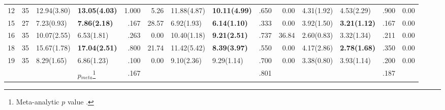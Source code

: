 \begin{sidewaystable}[!htbp]
{\begin{tabular}{ccllrr@{\hspace{2em}}llrr@{\hspace{2em}}llrr}
  12 & 35 & 12.94(3.80) & \textbf{13.05(4.03)} & 1.000 & 5.26 & 11.88(4.87) & \textbf{10.11(4.99)} & .650 & 0.00 & 4.31(1.92) & 4.53(2.29) & .900 & 0.00 \\ 
  15 & 27 & 7.23(0.93) & \textbf{7.86(2.18)} & .167 & 28.57 & 6.92(1.93) & \textbf{6.14(1.10)} & .333 & 0.00 & 3.92(1.50) & \textbf{3.21(1.12)} & .167 & 0.00 \\ 
  16 & 35 & 10.07(2.55) & 6.53(1.81) & .263 & 0.00 & 10.40(1.18) & \textbf{9.21(2.51)} & .737 & 36.84 & 2.60(0.83) & 3.32(1.34) & .211 & 0.00 \\ 
  18 & 35 & 15.67(1.78) & \textbf{17.04(2.51)} & .800 & 21.74 & 11.42(5.42) & \textbf{8.39(3.97)} & .550 & 0.00 & 4.17(2.86) & \textbf{2.78(1.68)} & .350 & 0.00 \\ 
  19 & 35 & 8.29(1.65) & 6.86(1.23) & .100 & 0.00 & 9.10(2.36) & 9.29(1.14) & .700 & 0.00 & 3.38(0.80) & 3.93(1.14) & .200 & 0.00 \\ 
   \cline{5-5} \cline{9-9} \cline{13-13}
 & & & ${p}$$_{meta}$\footnote{Meta-analytic ${p}$ value \parencite{onghena_customization_2005}.} &  .167 & & & &  .801 & & & &  .187 \\
 \bottomrule 
\end{tabular}
}
\end{sidewaystable}
